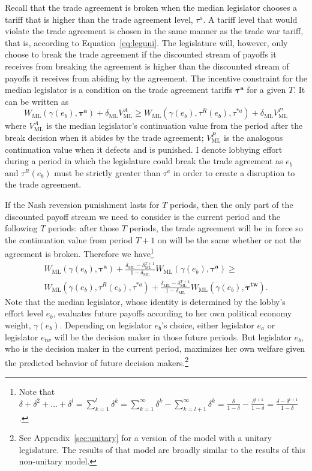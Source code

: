 \documentclass[authoryear, review]{elsarticle}
\newcommand{\bta}{\bm{\tau^a}}
\newcommand{\ga}{\gamma}
\newcommand{\btw}{\bm{\tau^{tw}}}
\newcommand{\de}{\delta}
\begin{document}
Recall that the trade agreement is broken when the median legislator chooses a tariff that is higher than the trade agreement level, $\tau^a$. A tariff level that would violate the trade agreement is chosen in the same manner as the trade war tariff, that is, according to Equation~\ref{eq:leguni}. The legislature will, however, only choose to break the trade agreement if the discounted stream of payoffs it receives from breaking the agreement is higher than the discounted stream of payoffs it receives from abiding by the agreement. The incentive constraint for the median legislator is a condition on the trade agreement tariffs $\bta$ for a given $T$. It can be written as
\[
  W_\text{ML}(\ga(e_b),\bta) + \de_\text{ML} V^A_\text{ML} \geq W_\text{ML}(\ga(e_b),\tau^R(e_b),\tau^{*a}) + \de_\text{ML} V^P_\text{ML}
\]
where $V^A_\text{ML}$ is the median legislator's continuation value from the period after the break decision when it abides by the trade agreement; $V^P_\text{ML}$ is the analogous continuation value when it defects and is punished. I denote lobbying effort during a period in which the legislature could break the trade agreement as $e_b$ and $\tau^R(e_b)$ must be strictly greater than $\tau^a$ in order to create a disruption to the trade agreement.

If the Nash reversion punishment lasts for $T$ periods, then the only part of the discounted payoff stream we need to consider is the current period and the following $T$ periods: after those $T$ periods, the trade agreement will be in force so the continuation value from period $T+1$ on will be the same whether or not the agreement is broken. Therefore we have\footnote{Note that $\de + \de^2 + \ldots + \de^l = \sum_{k=1}^l \de^k= \sum_{k=1}^\infty \de^k - \sum_{k=l+1}^\infty \de^k = \frac{\de}{1-\de} - \frac{\de^{l+1}}{1-\de} = \frac{\de - \de^{l+1}}{1-\de} $.}
\begin{multline}
  W_\text{ML}(\ga(e_b),\bta) + \frac{\de_\text{ML} - \de_\text{ML}^{T+1}}{1-\de_\text{ML}} W_\text{ML}(\ga(e_b),\bta) \geq \\
	W_\text{ML}(\ga(e_b),\tau^R(e_b),\tau^{*a}) + \frac{\de_\text{ML} - \de_\text{ML}^{T+1}}{1-\de_\text{ML}} W_\text{ML}(\ga(e_b),\btw).
  \label{ine:leg}
\end{multline}
Note that the median legislator, whose identity is determined by the lobby's effort level $e_b$, evaluates future payoffs according to her own political economy weight, $\ga(e_b)$. Depending on legislator $e_b$'s choice, either legislator $e_a$ or legislator $e_{tw}$ will be the decision maker in those future periods. But legislator $e_b$, who is the decision maker in the current period, maximizes her own welfare given the predicted behavior of future decision makers.\footnote{See Appendix~\ref{sec:unitary} for a version of the model with a unitary legislature. The results of that model are broadly similar to the results of this non-unitary model.}
\end{document}

